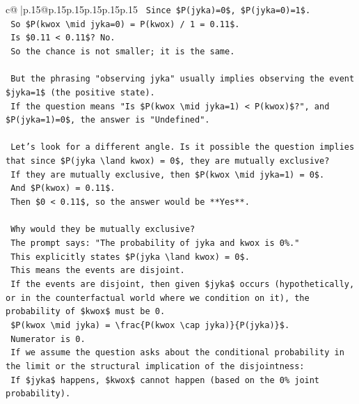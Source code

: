 \documentclass{article}
\begin{document}
{\begin{supertabular}{c@{$\;$}|p{.15\linewidth}@{}p{.15\linewidth}p{.15\linewidth}p{.15\linewidth}p{.15\linewidth}p{.15\linewidth}}
{{{\texttt{        Since \$P(jyka)=0\$, \$P(jyka=0)=1\$.} \\
\texttt{        So \$P(kwox \textbackslash{}mid jyka=0) = P(kwox) / 1 = 0.11\$.} \\
\texttt{        Is \$0.11 < 0.11\$? No.} \\
\texttt{        So the chance is not smaller; it is the same.} \\
\\ 
\texttt{        But the phrasing "observing jyka" usually implies observing the event \$jyka=1\$ (the positive state).} \\
\texttt{        If the question means "Is \$P(kwox \textbackslash{}mid jyka=1) < P(kwox)\$?", and \$P(jyka=1)=0\$, the answer is "Undefined".} \\
\\ 
\texttt{        Let's look for a different angle. Is it possible the question implies that since \$P(jyka \textbackslash{}land kwox) = 0\$, they are mutually exclusive?} \\
\texttt{        If they are mutually exclusive, then \$P(kwox \textbackslash{}mid jyka=1) = 0\$.} \\
\texttt{        And \$P(kwox) = 0.11\$.} \\
\texttt{        Then \$0 < 0.11\$, so the answer would be **Yes**.} \\
\\ 
\texttt{        Why would they be mutually exclusive?} \\
\texttt{        The prompt says: "The probability of jyka and kwox is 0\%."} \\
\texttt{        This explicitly states \$P(jyka \textbackslash{}land kwox) = 0\$.} \\
\texttt{        This means the events are disjoint.} \\
\texttt{        If the events are disjoint, then given \$jyka\$ occurs (hypothetically, or in the counterfactual world where we condition on it), the probability of \$kwox\$ must be 0.} \\
\texttt{        \$P(kwox \textbackslash{}mid jyka) = \textbackslash{}frac\{P(kwox \textbackslash{}cap jyka)\}\{P(jyka)\}\$.} \\
\texttt{        Numerator is 0.} \\
\texttt{        If we assume the question asks about the conditional probability in the limit or the structural implication of the disjointness:} \\
\texttt{        If \$jyka\$ happens, \$kwox\$ cannot happen (based on the 0\% joint probability).} \\
}}}
\end{supertabular}}
\end{document}
